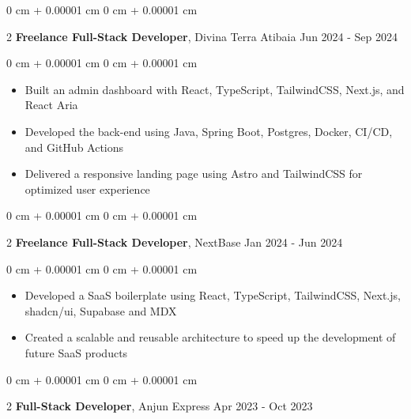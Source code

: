 \documentclass[10pt, letterpaper]{article}
\newenvironment{highlights}{ \begin{itemize}[ topsep=0.10 cm, parsep=0.10 cm, partopsep=0pt,
itemsep=0pt, leftmargin=0 cm + 10pt ] }{ \end{itemize} } %
\newenvironment{onecolentry}{ \begin{adjustwidth}{ 0 cm + 0.00001 cm }{ 0 cm + 0.00001 cm }
}{ \end{adjustwidth} } %
\newenvironment{twocolentry}[2][]{ \onecolentry \def\secondColumn{#2} \setcolumnwidth{\fill, 4.5 cm}
\begin{paracol}{2} }{ \switchcolumn \raggedleft \secondColumn \end{paracol}
\endonecolentry } %
\begin{document}
	\vspace{0.2 cm}

	\begin{twocolentry}
		{ Jun 2024 - Sep 2024 } \textbf{Freelance Full-Stack Developer}, Divina Terra Atibaia
	\end{twocolentry}

	\vspace{0.10 cm}
	\begin{onecolentry}
		\begin{highlights}
			\item Built an admin dashboard with React, TypeScript, TailwindCSS, Next.js,
			and React Aria
			\item Developed the back-end using Java, Spring Boot, Postgres,
			Docker, CI/CD, and GitHub Actions
			\item Delivered a responsive landing
			page using Astro and TailwindCSS for optimized user experience
		\end{highlights}
	\end{onecolentry}

	\vspace{0.2 cm}

	\begin{twocolentry}
		{ Jan 2024 - Jun 2024 } \textbf{Freelance Full-Stack Developer}, NextBase
	\end{twocolentry}

	\vspace{0.10 cm}
	\begin{onecolentry}
		\begin{highlights}
			\item Developed a SaaS boilerplate using React, TypeScript, TailwindCSS,
			Next.js, shadcn/ui, Supabase and MDX
			\item Created a scalable and reusable
			architecture to speed up the development of future SaaS products
		\end{highlights}
	\end{onecolentry}

	\vspace{0.2 cm}

	\begin{twocolentry}
		{ Apr 2023 - Oct 2023 } \textbf{Full-Stack Developer}, Anjun Express
	\end{twocolentry}
\end{document}
